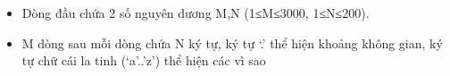 \begin{itemize}
	\item Dòng đầu chứa 2 số nguyên dương M,N (1≤M≤3000, 1≤N≤200).
	\item M dòng sau mỗi dòng chứa N ký tự, ký tự ‘.’ thể hiện khoảng không gian, ký tự chữ cái la tinh (‘a’..’z’) thể hiện các vì sao
\end{itemize}